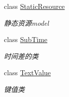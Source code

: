 \begin{DoxyCompactItemize}
class \hyperlink{class_x_c_l_net_tools_1_1_entity_1_1_static_resource}{Static\-Resource}
\begin{DoxyCompactList}\small\item\em 静态资源model \end{DoxyCompactList}\item 
class \hyperlink{class_x_c_l_net_tools_1_1_entity_1_1_sub_time}{Sub\-Time}
\begin{DoxyCompactList}\small\item\em 时间差的类 \end{DoxyCompactList}\item 
class \hyperlink{class_x_c_l_net_tools_1_1_entity_1_1_text_value}{Text\-Value}
\begin{DoxyCompactList}\small\item\em 键值类 \end{DoxyCompactList}\end{DoxyCompactItemize}
